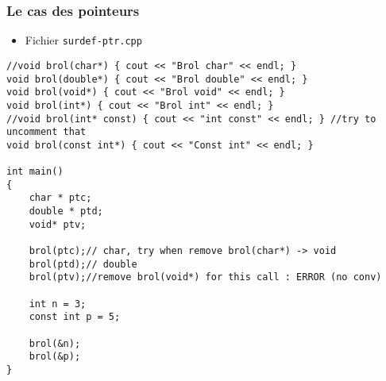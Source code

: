 \begin{frame}[containsverbatim]
\frametitle{Le cas des pointeurs}
\begin{itemize}
\item Fichier \texttt{surdef-ptr.cpp}
\end{itemize}
\begin{lstlisting}
//void brol(char*) { cout << "Brol char" << endl; }
void brol(double*) { cout << "Brol double" << endl; }
void brol(void*) { cout << "Brol void" << endl; }
void brol(int*) { cout << "Brol int" << endl; }
//void brol(int* const) { cout << "int const" << endl; } //try to uncomment that
void brol(const int*) { cout << "Const int" << endl; }

int main()
{
	char * ptc;
	double * ptd;
	void* ptv;
	
	brol(ptc);// char, try when remove brol(char*) -> void
	brol(ptd);// double		
	brol(ptv);//remove brol(void*) for this call : ERROR (no conv)

	int n = 3;
	const int p = 5;

	brol(&n);
	brol(&p);		
}
\end{lstlisting}
\end{frame}


